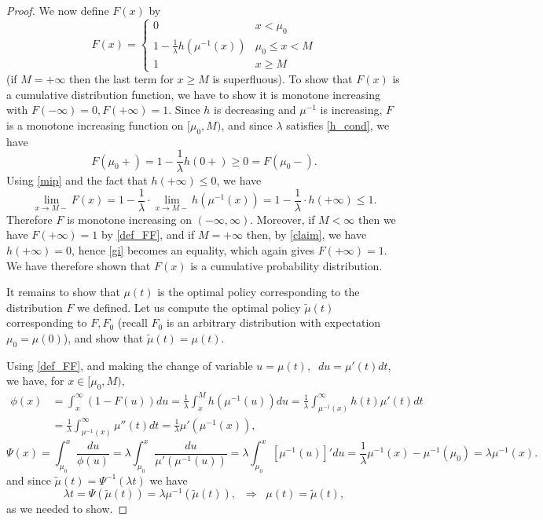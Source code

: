 \documentclass{article}
\numberwithin{equation}{section}
\begin{document}
\begin{proof}
		We now define $F(x)$ by
		\begin{equation}\label{def_FF}F(x)=\begin{cases}
				0 & x<\mu_0\\
				1-\frac{1}{\lambda}h(\mu^{-1}(x)) & \mu_0\leq x<M\\
				1 & x\geq M
		\end{cases}\end{equation}
		(if $M=+\infty$ then the last term for $x\geq M$ is superfluous). To show that $F(x)$ is 
		a cumulative distribution function, we have to show it is monotone increasing  
		with $F(-\infty)=0,F(+\infty)=1$.
		Since $h$ is decreasing and $\mu^{-1}$ is increasing, 
		$F$ is a monotone increasing function on
		$[\mu_0,M)$, and since 
		$\lambda$ satisfies \eqref{h_cond}, we have
		\begin{equation*}\label{gi0}F(\mu_0+)=1-\frac{1}{\lambda} h(0+)\geq 0= F(\mu_0-).
		\end{equation*}
		Using \eqref{mip} and the fact that $h(+\infty)\leq 0$, we have
		\begin{equation}\label{gi}
			\lim_{x\rightarrow M-} F(x)=1-\frac{1}{\lambda}\cdot
			\lim_{x\rightarrow M-}h(\mu^{-1}(x))=1-\frac{1}{\lambda}\cdot
			h(+\infty)\leq 1.
		\end{equation}
		Therefore $F$ is monotone increasing on 
		$(-\infty,\infty)$. 
		Moreover, if $M<\infty$ then we have
		$F(+\infty)=1$ by \eqref{def_FF}, and if $M=+\infty$ then, by 
		\eqref{claim}, we have $h(+\infty)=0$, hence \eqref{gi} 
		becomes an equality, which again gives $F(+\infty)=1$. 
		We have therefore shown that $F(x)$ 
		is a cumulative probability distribution.
		
		It remains to show that $\mu(t)$ is 
		the optimal policy corresponding to the distribution $F$ we defined. Let us compute 
		the optimal policy $\tilde{\mu}(t)$  corresponding to $F,F_0$ (recall $F_0$ is an arbitrary distribution with expectation $\mu_0=\mu(0)$), and show that $\tilde{\mu}(t)=\mu(t)$.
		
		Using
		\eqref{def_FF}, and making the change of variable $u=\mu(t),\;\;du=\mu'(t)dt$, we have, for 
		$x\in [\mu_0,M)$,
		\begin{align*}\phi(x)&=\int_x^\infty (1-F(u))du
			=\frac{1}{\lambda}\int_x^M h(\mu^{-1}(u))du=\frac{1}{\lambda}\int_{\mu^{-1}(x)}^{\infty} h(t)\mu'(t)dt\\&=\frac{1}{\lambda}\int_{\mu^{-1}(x)}^{\infty} \mu''(t)dt=\frac{1}{\lambda}\mu'(\mu^{-1}(x)),
		\end{align*}
		$$\Psi(x)=\int_{\mu_0}^x \frac{du}{\phi(u)}=\lambda\int_{\mu_0}^x \frac{du}{\mu'(\mu^{-1}(u))}=\lambda\int_{\mu_0}^x [\mu^{-1}(u)]'du=\frac{1}{\lambda}\mu^{-1}(x)-\mu^{-1}(\mu_0)=\lambda\mu^{-1}(x).$$
		and since $\tilde{\mu}(t)=\Psi^{-1}(\lambda t)$ we have
		$$\lambda t=\Psi(\tilde{\mu}(t))=\lambda \mu^{-1}(\tilde{\mu}(t)),\;\;\Rightarrow \;\; \mu(t)=\tilde{\mu}(t),$$
		as we needed to show.
		
		
		
	\end{proof}
	
\end{document}
